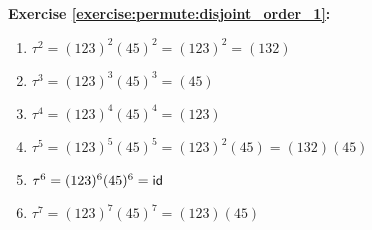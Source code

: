 \noindent\textbf{Exercise \ref{exercise:permute:disjoint_order_1}:}
\begin{enumerate}[{a.}]
\item 
$\tau^2 = (123)^2(45)^2 = (123)^2 = (132)$

\item 
$\tau^3 = (123)^3(45)^3 = (45)$

\item 
$\tau^4 = (123)^4(45)^4 = (123)$

\item 
$\tau^5 = (123)^5(45)^5 = (123)^2(45) = (132)(45)$

\item 
$\tau^6 =  (123)^6(45)^6 = \sf{id}$

\item
$\tau^7 =  (123)^7(45)^7 = (123)(45)$
\end{enumerate}

